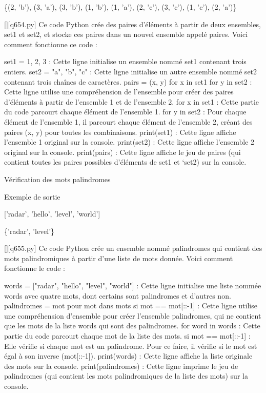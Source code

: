 \{(2, 'b'), (3, 'a'), (3, 'b'), (1, 'b'), (1, 'a'), (2, 'c'), (3, 'c'), (1, 'c'), (2, 'a')\}
        \par
        \begin{solution}
            \renewcommand{\nomfichier}{q654.py}
            \pythonfile{\chemincode \nomfichier}[][\nomfichier]
            Ce code Python crée des paires d'éléments à partir de deux ensembles, set1 et set2, et stocke ces paires dans un nouvel ensemble appelé paires. Voici comment fonctionne ce code :

    set1 = {1, 2, 3} : Cette ligne initialise un ensemble nommé set1 contenant trois entiers.
    set2 = {"a", "b", "c"} : Cette ligne initialise un autre ensemble nommé set2 contenant trois chaînes de caractères.
    pairs = {(x, y) for x in set1 for y in set2} : Cette ligne utilise une compréhension de l'ensemble pour créer des paires d'éléments à partir de l'ensemble 1 et de l'ensemble 2.
        for x in set1 : Cette partie du code parcourt chaque élément de l'ensemble 1.
        for y in set2 : Pour chaque élément de l'ensemble 1, il parcourt chaque élément de l'ensemble 2, créant des paires (x, y) pour toutes les combinaisons.
    print(set1) : Cette ligne affiche l'ensemble 1 original sur la console.
    print(set2) : Cette ligne affiche l'ensemble 2 original sur la console.
    print(pairs) : Cette ligne affiche le jeu de paires (qui contient toutes les paires possibles d'éléments de set1 et `set2) sur la console.
        \end{solution}
        

        \question
        Vérification des mots palindromes

Exemple de sortie

['radar', 'hello', 'level', 'world']

\{'radar', 'level'\}
        \par
        \begin{solution}
            \renewcommand{\nomfichier}{q655.py}
            \pythonfile{\chemincode \nomfichier}[][\nomfichier]
            Ce code Python crée un ensemble nommé palindromes qui contient des mots palindromiques à partir d'une liste de mots donnée. Voici comment fonctionne le code :

    words = ["radar", "hello", "level", "world"] : Cette ligne initialise une liste nommée words avec quatre mots, dont certains sont palindromes et d'autres non.
    palindromes = {mot pour mot dans mots si mot == mot[::-1]} : Cette ligne utilise une compréhension d'ensemble pour créer l'ensemble palindromes, qui ne contient que les mots de la liste words qui sont des palindromes.
        for word in words : Cette partie du code parcourt chaque mot de la liste des mots.
        si mot == mot[::-1] : Elle vérifie si chaque mot est un palindrome. Pour ce faire, il vérifie si le mot est égal à son inverse (mot[::-1]).
    print(words) : Cette ligne affiche la liste originale des mots sur la console.
    print(palindromes) : Cette ligne imprime le jeu de palindromes (qui contient les mots palindromiques de la liste des mots) sur la console.
        \end{solution}
        

